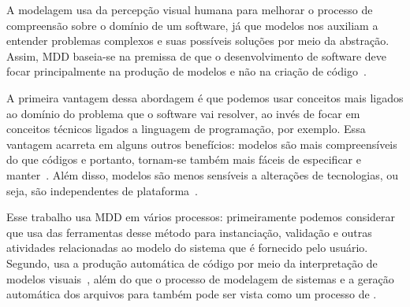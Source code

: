 A modelagem usa da percepção visual humana para melhorar o processo de compreensão sobre o domínio de um software, já que modelos nos auxiliam a entender problemas complexos e suas possíveis soluções por meio da abstração. Assim, MDD baseia-se na premissa de que o desenvolvimento de software deve focar principalmente na produção de modelos e não na criação de código~\cite{selic2003pragmatics}.

A primeira vantagem dessa abordagem é que podemos usar conceitos mais ligados ao domínio do problema que o software vai resolver, ao invés de focar em conceitos técnicos ligados a linguagem de programação, por exemplo. Essa vantagem acarreta em alguns outros benefícios: modelos são mais compreensíveis do que códigos e portanto, tornam-se também mais fáceis de especificar e manter~\cite{selic2003pragmatics}. Além disso, modelos são menos sensíveis a alterações de tecnologias, ou seja, são independentes de plataforma~\cite{selic2003pragmatics}. 

Esse trabalho usa MDD em vários processos: primeiramente podemos considerar que \zanshin usa das ferramentas desse método para instanciação, validação e outras atividades relacionadas ao modelo do sistema que é fornecido pelo usuário. Segundo, \unagi usa a produção automática de código por meio da interpretação de modelos visuais~\cite{selic2003pragmatics, viyovic2014sirius}, além do que  o processo de modelagem de sistemas e a geração automática dos arquivos \xml para \zanshin também pode ser vista como um processo de \mdd.


